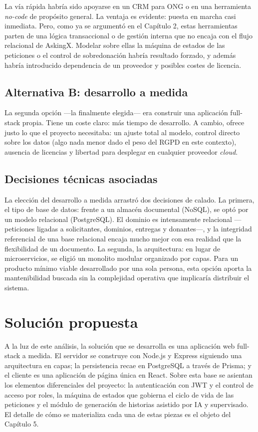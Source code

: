 \documentclass[11pt,oneside,spanish,listoffigures,listoftables]{tfgetsinf}
\begin{document}
La vía rápida habría sido apoyarse en un CRM para ONG o en una herramienta \textit{no-code} de propósito general. La ventaja es evidente: puesta en marcha casi inmediata. Pero, como ya se argumentó en el Capítulo 2, estas herramientas parten de una lógica transaccional o de gestión interna que no encaja con el flujo relacional de AskingX. Modelar sobre ellas la máquina de estados de las peticiones o el control de sobredonación habría resultado forzado, y además habría introducido dependencia de un proveedor y posibles costes de licencia.

\subsection{Alternativa B: desarrollo a medida}

La segunda opción —la finalmente elegida— era construir una aplicación full-stack propia. Tiene un coste claro: más tiempo de desarrollo. A cambio, ofrece justo lo que el proyecto necesitaba: un ajuste total al modelo, control directo sobre los datos (algo nada menor dado el peso del RGPD en este contexto), ausencia de licencias y libertad para desplegar en cualquier proveedor \textit{cloud}.

\subsection{Decisiones técnicas asociadas}

La elección del desarrollo a medida arrastró dos decisiones de calado. La primera, el tipo de base de datos: frente a un almacén documental (NoSQL), se optó por un modelo relacional (PostgreSQL). El dominio es intensamente relacional —peticiones ligadas a solicitantes, dominios, entregas y donantes—, y la integridad referencial de una base relacional encaja mucho mejor con esa realidad que la flexibilidad de un documento. La segunda, la arquitectura: en lugar de microservicios, se eligió un monolito modular organizado por capas. Para un producto mínimo viable desarrollado por una sola persona, esta opción aporta la mantenibilidad buscada sin la complejidad operativa que implicaría distribuir el sistema.

\section{Solución propuesta}

A la luz de este análisis, la solución que se desarrolla es una aplicación web full-stack a medida. El servidor se construye con Node.js y Express siguiendo una arquitectura en capas; la persistencia recae en PostgreSQL a través de Prisma; y el cliente es una aplicación de página única en React. Sobre esta base se asientan los elementos diferenciales del proyecto: la autenticación con JWT y el control de acceso por roles, la máquina de estados que gobierna el ciclo de vida de las peticiones y el módulo de generación de historias asistido por IA y supervisado. El detalle de cómo se materializa cada una de estas piezas es el objeto del Capítulo 5.
\end{document}
